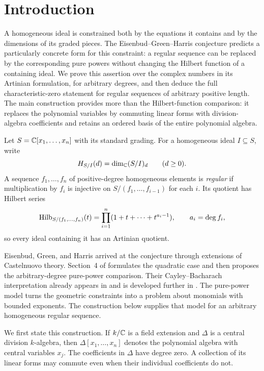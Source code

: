 \section{Introduction}\label{sec:introduction}

A homogeneous ideal is constrained both by the equations it contains and by the dimensions of its graded pieces. The Eisenbud--Green--Harris conjecture predicts a particularly concrete form for this constraint: a regular sequence can be replaced by the corresponding pure powers without changing the Hilbert function of a containing ideal. We prove this assertion over the complex numbers in its Artinian formulation, for arbitrary degrees, and then deduce the full characteristic-zero statement for regular sequences of arbitrary positive length. The main construction provides more than the Hilbert-function comparison: it replaces the polynomial variables by commuting linear forms with division-algebra coefficients and retains an ordered basis of the entire polynomial algebra.

Let $S=\mathbb C[x_1,\ldots,x_n]$ with its standard grading. For a homogeneous ideal $I\subseteq S$, write
\[
 H_{S/I}(d)=\dim_\mathbb C(S/I)_d\qquad(d\ge0).
\]
A sequence $f_1,\ldots,f_n$ of positive-degree homogeneous elements is \emph{regular} if multiplication by $f_i$ is injective on $S/(f_1,\ldots,f_{i-1})$ for each $i$. Its quotient has Hilbert series
\[
 \operatorname{Hilb}_{S/(f_1,\ldots,f_n)}(t)
 =\prod_{i=1}^n(1+t+\cdots+t^{a_i-1}),\qquad a_i=\deg f_i,
\]
so every ideal containing it has an Artinian quotient.

Eisenbud, Green, and Harris arrived at the conjecture through extensions
of Castelnuovo theory. Section~4 of \cite{EGH93} formulates the quadratic
case and then proposes the arbitrary-degree pure-power comparison.
Their Cayley--Bacharach interpretation already appears in
\cite[Section~3]{EGH93} and is developed further in
\cite[Section~2.1]{EGH96}. The pure-power model turns the geometric
constraints into a problem about monomials with bounded exponents.
The construction below supplies that model for an arbitrary homogeneous
regular sequence.

We first state this construction. If $k/\mathbb C$ is a field extension and
$\Delta$ is a central division $k$-algebra, then
$\Delta[x_1,\ldots,x_n]$ denotes the polynomial algebra with central
variables $x_j$. The coefficients in $\Delta$ have degree zero. A
collection of its linear forms may commute even when their individual
coefficients do not.

